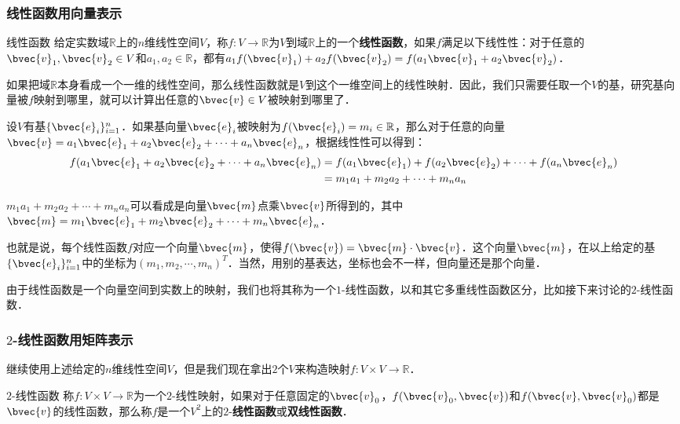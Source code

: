 \subsubsection{线性函数用向量表示}
\begin{definition}{线性函数}
给定实数域$\mathbb{R}$上的$n$维线性空间$V$，称$f:V\rightarrow \mathbb{R}$为$V$到域$\mathbb{R}$上的一个\textbf{线性函数}，如果$f$满足以下线性性：对于任意的$\bvec{v}_1, \bvec{v}_2\in V$和$a_1, a_2\in\mathbb{R}$，都有$a_1f(\bvec{v}_1)+a_2f(\bvec{v}_2)=f(a_1\bvec{v}_1+a_2\bvec{v}_2)$．
\end{definition}

如果把域$\mathbb{R}$本身看成一个一维的线性空间，那么线性函数就是$V$到这个一维空间上的线性映射．因此，我们只需要任取一个$V$的基，研究基向量被$f$映射到哪里，就可以计算出任意的$\bvec{v}\in V$被映射到哪里了．

设$V$有基$\{\bvec{e}_i\}_{i=1}^n$．如果基向量$\bvec{e}_i$被映射为$f(\bvec{e}_i)=m_i\in\mathbb{R}$，那么对于任意的向量$\bvec{v}=a_1\bvec{e}_1+a_2\bvec{e}_2+\cdots+a_n\bvec{e}_n$，根据线性性可以得到：
\begin{equation}
\begin{aligned}
f(a_1\bvec{e}_1+a_2\bvec{e}_2+\cdots+a_n\bvec{e}_n)&=f(a_1\bvec{e}_1)+f(a_2\bvec{e}_2)+\cdots+f(a_n\bvec{e}_n)\\&=m_1a_1+m_2a_2+\cdots+m_na_n
\end{aligned}
\end{equation}

$m_1a_1+m_2a_2+\cdots+m_na_n$可以看成是向量$\bvec{m}$点乘$\bvec{v}$所得到的，其中$\bvec{m}=m_1\bvec{e}_1+m_2\bvec{e}_2+\cdots+m_n\bvec{e}_n$．

也就是说，每个线性函数$f$对应一个向量$\bvec{m}$，使得$f(\bvec{v})=\bvec{m}\cdot\bvec{v}$．这个向量$\bvec{m}$，在以上给定的基$\{\bvec{e}_i\}_{i=1}^n$中的坐标为$(m_1, m_2, \cdots, m_n)^T$．当然，用别的基表达，坐标也会不一样，但向量还是那个向量．

由于线性函数是一个向量空间到实数上的映射，我们也将其称为一个$1$-线性函数，以和其它多重线性函数区分，比如接下来讨论的$2$-线性函数．

\subsubsection{$2$-线性函数用矩阵表示}

继续使用上述给定的$n$维线性空间$V$，但是我们现在拿出$2$个$V$来构造映射$f:V\times V\rightarrow\mathbb{R}$．

\begin{definition}{$2$-线性函数}
称$f:V\times V\rightarrow\mathbb{R}$为一个$2$-线性映射，如果对于任意固定的$\bvec{v}_0$，$f(\bvec{v}_0, \bvec{v})$和$f(\bvec{v}, \bvec{v}_0)$都是$\bvec{v}$的线性函数，那么称$f$是一个$V^2$上的$2$-\textbf{线性函数}或\textbf{双线性函数}．
\end{definition}

